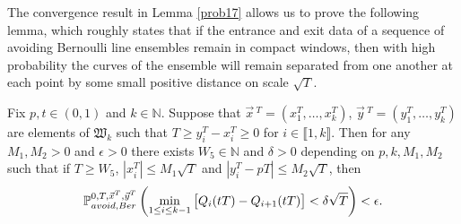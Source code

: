 The convergence result in Lemma \ref{prob17} allows us to prove the following lemma, which roughly states that if the entrance and exit data of a sequence of avoiding Bernoulli line ensembles remain in compact windows, then with high probability the curves of the ensemble will remain separated from one another at each point by some small positive distance on scale $\sqrt{T}$.

\begin{lemma}\label{prob 20}
Fix $p,t\in (0,1)$ and $ k\in \mathbb{N}$. Suppose that $\vec x\,^T=(x_1^T,\dots, x_k^T)$, $\vec y\,^T=(y_1^T,\dots , y_k^T)$ are elements of $\mathfrak{W}_k$ such that $T\geq y_i^T-x_i^T\geq 0$ for $i\in \llbracket 1,k\rrbracket$. Then for any $M_1,M_2>0$ and $\epsilon>0$ there exists $W_5\in\mathbb{N}$ and $\delta>0$ depending on $p,k,M_1,M_2$ such that if $T\geq W_5$, $|x_i^T|\leq M_1\sqrt{T}$ and $|y_i^T-pT|\leq M_2\sqrt{T}$, then 
\[
\mathbb{P}^{0,T,\vec x^T, \vec y^T}_{avoid,Ber}\left(\min_{1\leq i\leq k-1} \big[Q_i(tT)-Q_{i+1}(tT)\big]<\delta\sqrt{T}\right)<\epsilon.
\]
\end{lemma}
